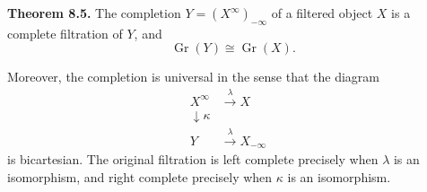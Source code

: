 \textbf{Theorem 8.5.} The completion $Y = (X^\infty)_{-\infty}$ of a filtered object $X$ is a complete filtration of $Y$, and
$$
\operatorname{Gr}(Y) \cong \operatorname{Gr}(X).
$$

Moreover, the completion is universal in the sense that the diagram
$$
\begin{array}{ccc}
X^\infty & \xrightarrow{\lambda} X \\
\downarrow{\scriptstyle \kappa} && \\
Y & \xrightarrow{\lambda} X_{-\infty}
\end{array}
$$
is bicartesian. The original filtration is left complete precisely when $\lambda$ is an isomorphism, and right complete precisely when $\kappa$ is an isomorphism.
